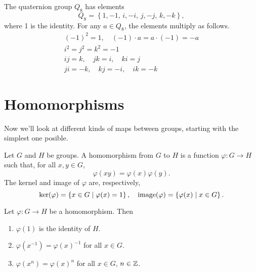 \documentclass[../m171main.tex]{subfiles}
\begin{document}
\begin{definition}
    The quaternion group $Q_8$ has elements
    \[ Q_8 = \left\{ 1, -1, \, i, -i, \, j, -j, \, k, -k \right\}, \]
    where 1 is the identity.
    For any $a \in Q_8$, the elements multiply as follows.
    \begin{gather*}
        (-1)^2 = 1, \quad (-1) \cdot a = a \cdot (-1) = -a \\
        i^2 = j^2 = k^2 = -1 \\
        ij = k, \quad jk = i, \quad ki = j \\
        ji = -k, \quad kj = -i, \quad ik = -k
    \end{gather*}
\end{definition}



\section{Homomorphisms}
Now we'll look at different kinds of maps between groups, starting with the simplest one posible.

\begin{definition}[Homomorphism]
    Let $G$ and $H$ be groups.
    A homomorphism from $G$ to $H$ is a function $\varphi : G \to H$ such that, for all $x,y \in G$,
    \[ \varphi(xy) = \varphi(x) \varphi(y). \]
    The kernel and image of $\varphi$ are, respectively,
    \[ \ker (\varphi) = \left\{ x \in G \; | \; \varphi(x) = 1 \right\}, \quad \textrm{image} (\varphi) = \left\{ \varphi(x) \; | \; x \in G \right\}. \]
\end{definition}


\begin{theorem}[]
    Let $\varphi : G \to H$ be a homomorphism.
    Then
    \begin{enumerate}[label=(\alph*)]
        \item $\varphi(1)$ is the identity of $H$.
        \item $\varphi(x^{-1}) = \varphi(x)^{-1}$ for all $x \in G$.
        \item $\varphi(x^{n}) = \varphi(x)^{n}$ for all $x \in G$, $n \in \mathbb{Z}$.
    \end{enumerate}
\end{theorem}
\end{document}

